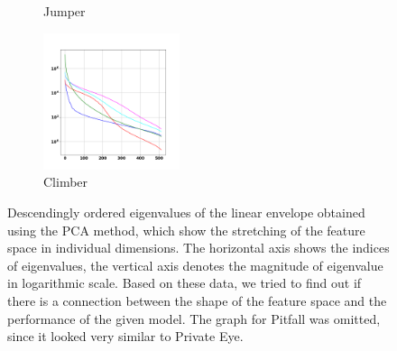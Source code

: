 \documentclass[a4paper,11pt]{elsarticle}
\begin{document}
\begin{figure}[t!]
\begin{subfigure}[b]{0.3\textwidth}
    \caption{Jumper}
    \label{fig:analysis2h}
  \end{subfigure}
    \begin{subfigure}[b]{0.3\textwidth}
    \centering
    \includegraphics[width=4cm]{fig/analysis/anal_climber.png}
    \caption{Climber}
    \label{fig:analysis2i}
  \end{subfigure}
\caption{Descendingly ordered eigenvalues of the linear envelope obtained using the PCA method, which show the stretching of the feature space in individual dimensions. 
The horizontal axis shows the indices of eigenvalues, the vertical axis denotes the magnitude of eigenvalue in logarithmic scale.
Based on these data, we tried to find out if there is a connection between the shape of the feature space and the performance of the given model. The graph for Pitfall was omitted, since it looked very similar to Private Eye. }
\label{fig:cnd_analysis}
\end{figure}

\iffalse
\end{document}
